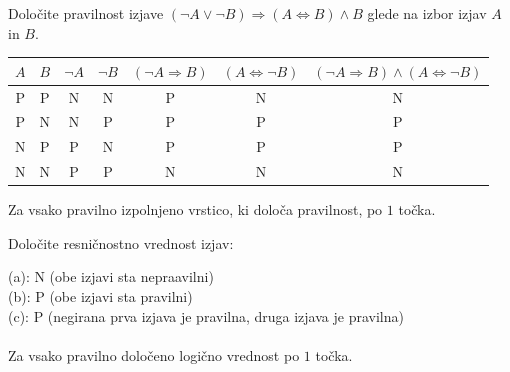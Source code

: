 \documentclass[addpoints]{exam}
\begin{document}
\begin{questions}

    
    \question[4]
    Določite pravilnost izjave $(\lnot A \lor  \lnot B)\Rightarrow (A\Leftrightarrow  B) \land B$ glede na izbor izjav $A$ in $B$.

    \begin{solution}[11cm]
        \begin{table}[H]
            \begin{tabular}{ccccccc}
             $A$ & $B$ & $\lnot A$ & $\lnot B$ & $(\lnot A\Rightarrow B)$ & $(A\Leftrightarrow \lnot B)$ & $(\lnot A\Rightarrow B)\land(A\Leftrightarrow \lnot B)$\\ \hline
             P & P & N & N & P & N & N \\ 
             P & N & N & P & P & P & P \\
             N & P & P & N & P & P & P \\
             N & N & P & P & N & N & N
            \end{tabular}
        \end{table}
        Za vsako pravilno izpolnjeno vrstico, ki določa pravilnost, po $1$ točka.
    \end{solution}




    \question[3]
    Določite resničnostno vrednost izjav:

    \begin{solution}
        (a): N (obe izjavi sta nepraavilni) \\
        (b): P (obe izjavi sta pravilni) \\
        (c): P (negirana prva izjava je pravilna, druga izjava je pravilna) \\ \\
        Za vsako pravilno določeno logično vrednost po $1$ točka.
    \end{solution}




\end{questions}
\end{document}
